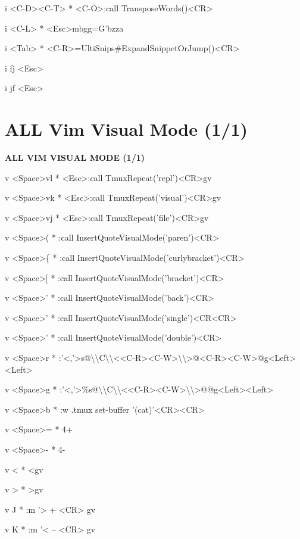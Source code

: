 \documentclass[11pt,a4paper,twoside]{book}
\begin{document}
i  <C-D><C-T>  * <C-O>:call TransposeWords()<CR>

i  <C-L>  * <Esc>mbgg=G'bzza

i  <Tab>  * <C-R>=UltiSnips\#ExpandSnippetOrJump()<CR>

i  fj  <Esc>

i  jf  <Esc>


\vspace{16pt}

\section{ALL Vim Visual Mode (1/1)}


\vspace{10pt}
{\large\bfseries\color{neoncyan} ALL VIM VISUAL MODE (1/1)}\vspace{6pt}

v  <Space>vl  * <Esc>:call TmuxRepeat('repl')<CR>gv

v  <Space>vk  * <Esc>:call TmuxRepeat('visual')<CR>gv

v  <Space>vj  * <Esc>:call TmuxRepeat('file')<CR>gv

v  <Space>(  * :call InsertQuoteVisualMode('paren')<CR>

v  <Space>\{  * :call InsertQuoteVisualMode('curlybracket')<CR>

v  <Space>[  * :call InsertQuoteVisualMode('bracket')<CR>

v  <Space>'  * :call InsertQuoteVisualMode('back')<CR>

v  <Space>'  * :call InsertQuoteVisualMode('single')<CR<CR>

v  <Space>'  * :call InsertQuoteVisualMode('double')<CR>

v  <Space>r  * :'<,'>s@\textbackslash{}\textbackslash{}C\textbackslash{}\textbackslash{}<<C-R><C-W>\textbackslash{}\textbackslash{}>@<C-R><C-W>@g<Left><Left>

v  <Space>g  * :'<,'>\%s@\textbackslash{}\textbackslash{}C\textbackslash{}\textbackslash{}<<C-R><C-W>\textbackslash{}\textbackslash{}>@@g<Left><Left>

v  <Space>b  * :w .tmux set-buffer '(cat)'<CR><CR>

v  <Space>=  * 4+

v  <Space>-  * 4-

v  <  * <gv

v  >  * >gv

v  J  * :m '> + <CR> gv

v  K  * :m '< -- <CR> gv
\end{document}
